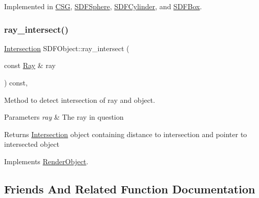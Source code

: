 Implemented in \mbox{\hyperlink{classCSG_a7dc0853ae99ffd54ea99eccdc5fd5acf}{C\+SG}}, \mbox{\hyperlink{classSDFSphere_aba1d5f7d9f16ee7fd40c5dae5df467d1}{S\+D\+F\+Sphere}}, \mbox{\hyperlink{classSDFCylinder_a20732b488b83720390197e50ead3883a}{S\+D\+F\+Cylinder}}, and \mbox{\hyperlink{classSDFBox_aaeab9858412c2f3ad7e19ec9738e8aca}{S\+D\+F\+Box}}.

\mbox{\label{classSDFObject_a3870048585282b8176a05ca46ab8695d}} 
\subsubsection{\texorpdfstring{ray\_intersect()}{ray\_intersect()}}
{\footnotesize\ttfamily \mbox{\hyperlink{classIntersection}{Intersection}} S\+D\+F\+Object\+::ray\+\_\+intersect (\begin{DoxyParamCaption}\item[{const \mbox{\hyperlink{classRay}{Ray}} \&}]{ray }\end{DoxyParamCaption}) const\hspace{0.3cm}{\ttfamily [override]}, {\ttfamily [virtual]}}



Method to detect intersection of ray and object. 


\begin{DoxyParams}{Parameters}
{\em ray} & The ray in question \\
\hline
\end{DoxyParams}
\begin{DoxyReturn}{Returns}
\mbox{\hyperlink{classIntersection}{Intersection}} object containing distance to intersection and pointer to intersected object 
\end{DoxyReturn}


Implements \mbox{\hyperlink{classRenderObject_aa844ad2c5ef0c2b79faef2ed0af553bb}{Render\+Object}}.



\subsection{Friends And Related Function Documentation}
\mbox{\label{classSDFObject_a31075b2d3758d4b9e5804142372a4eb4}} 
